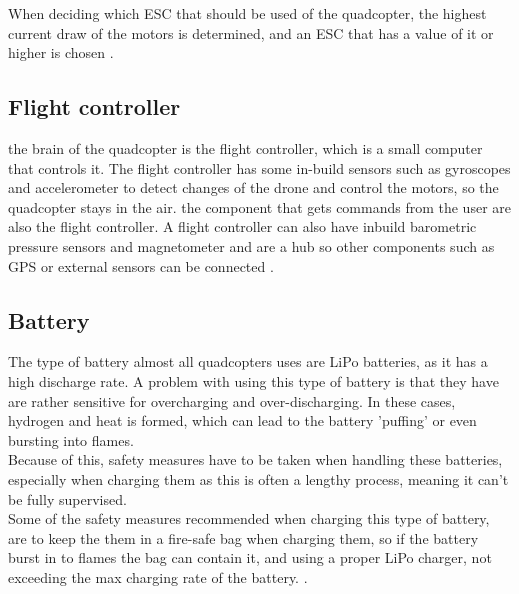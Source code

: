 When deciding which ESC that should be used of the quadcopter, the highest current draw of the motors is determined, and an ESC that has a value of it or higher is chosen \cite{DIYDrone}.

%
%
\subsection{Flight controller}
the brain of the quadcopter is the flight controller, which is a small computer that controls it. The flight controller has some in-build sensors such as gyroscopes and accelerometer to detect changes of the drone and control the motors, so the quadcopter stays in the air. the component that gets commands from the user are also the flight controller. A flight controller can also have inbuild barometric pressure sensors and magnetometer and are a hub so other components such as GPS or external sensors can be connected \cite{FlightController}.

%
%
\subsection{Battery}
The type of battery almost all quadcopters uses are LiPo batteries, as it has a high discharge rate. A problem with  using this type of battery is that they have are rather sensitive for overcharging and over-discharging. In these cases, hydrogen and heat is formed, which can lead to the battery 'puffing' or even bursting into flames.\\
Because of this, safety measures have to be taken when handling these batteries, especially when charging them as this is often a lengthy process, meaning it can't be fully supervised.\\
Some of the safety measures recommended when charging this type of battery, are to keep the them in a fire-safe bag when charging them, so if the battery burst in to flames the bag can contain it, and using a proper LiPo charger, not exceeding the max charging rate of the battery. 
\cite{DIYDrone}.

%
%
